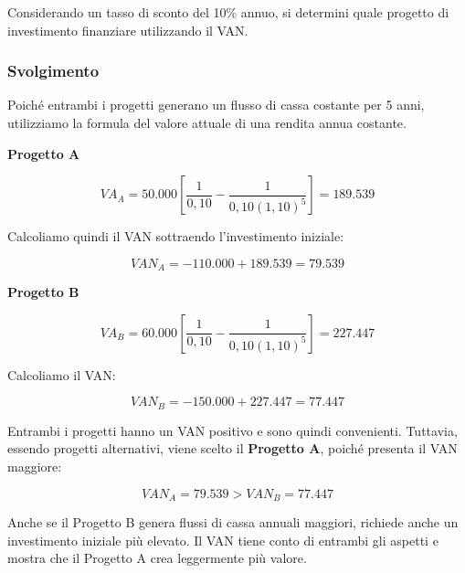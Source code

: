 \noindent Considerando un tasso di sconto del 10\% annuo, si determini quale
progetto di investimento finanziare utilizzando il VAN.
\subsubsection*{Svolgimento}

\noindent Poiché entrambi i progetti generano un flusso di cassa costante per
5 anni, utilizziamo la formula del valore attuale di una rendita annua costante.

\noindent\textbf{Progetto A}

\[
VA_A=
50.000
\left[
\frac{1}{0,10}
-\frac{1}{0,10(1,10)^5}
\right]
=189.539
\]

\noindent Calcoliamo quindi il VAN sottraendo l'investimento iniziale:

\[
VAN_A=-110.000+189.539
=\boxed{79.539}
\]

\noindent\textbf{Progetto B}

\[
VA_B=
60.000
\left[
\frac{1}{0,10}
-\frac{1}{0,10(1,10)^5}
\right]
=227.447
\]

\noindent Calcoliamo il VAN:

\[
VAN_B=-150.000+227.447
=\boxed{77.447}
\]

\noindent Entrambi i progetti hanno un VAN positivo e sono quindi convenienti.
Tuttavia, essendo progetti alternativi, viene scelto il \textbf{Progetto A},
poiché presenta il VAN maggiore:

\[
\boxed{VAN_A=79.539 > VAN_B=77.447}
\]

\noindent Anche se il Progetto B genera flussi di cassa annuali maggiori,
richiede anche un investimento iniziale più elevato. Il VAN tiene conto di
entrambi gli aspetti e mostra che il Progetto A crea leggermente più valore.